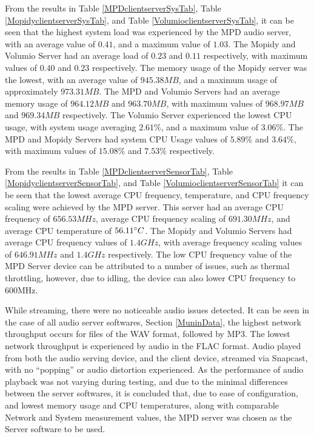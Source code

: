 \documentclass[11pt,a4paper,headinclude=false,footinclude=false]{scrreprt}
\begin{document}
From the results in Table \ref{MPDclientserverSysTab}, Table
\ref{MopidyclientserverSysTab}, and Table
\ref{VolumioclientserverSysTab}, it can be seen that the highest system
load was experienced by the MPD audio server, with an average value of
\(0.41\), and a maximum value of \(1.03\). The Mopidy and Volumio Server
had an average load of \(0.23\) and \(0.11\) respectively, with maximum
values of \(0.40\) and \(0.23\) respectively. The memory usage of the
Mopidy server was the lowest, with an average value of \(945.38MB\), and
a maximum usage of approximately \(973.31MB\). The MPD and Volumio
Servers had an average memory usage of \(964.12MB\) and \(963.70MB\),
with maximum values of \(968.97MB\) and \(969.34MB\) respectively. The
Volumio Server experienced the lowest CPU usage, with system usage
averaging \(2.61\%\), and a maximum value of \(3.06\%\). The MPD and
Mopidy Servers had system CPU Usage values of \(5.89\%\) and \(3.64\%\),
with maximum values of \(15.08\%\) and \(7.53\%\) respectively.

From the results in Table \ref{MPDclientserverSensorTab}, Table
\ref{MopidyclientserverSensorTab}, and Table
\ref{VolumioclientserverSensorTab} it can be seen that the lowest
average CPU frequency, temperature, and CPU frequency scaling were
achieved by the MPD server. This server had an average CPU frequency of
\(656.53MHz\), average CPU frequency scaling of \(691.30MHz\), and
average CPU temperature of \(56.11 \degree C\). The Mopidy and Volumio
Servers had average CPU frequency values of \(1.4GHz\), with average
frequency scaling values of \(646.91MHz\) and \(1.4GHz\) respectively.
The low CPU frequency value of the MPD Server device can be attributed
to a number of issues, such as thermal throttling, however, due to
idling, the device can also lower CPU frequency to 600MHz\cite{RPiFreq}.

While streaming, there were no noticeable audio issues detected. It can
be seen in the case of all audio server softwares, Section
\ref{MuninData}, the highest network throughput occurs for files of the
WAV format, followed by MP3. The lowest network throughput is
experienced by audio in the FLAC format. Audio played from both the
audio serving device, and the client device, streamed via Snapcast, with
no ``popping'' or audio distortion experienced. As the performance of
audio playback was not varying during testing, and due to the minimal
differences between the server softwares, it is concluded that, due to
ease of configuration, and lowest memory usage and CPU temperatures,
along with comparable Network and System measurement values, the MPD
server was chosen as the Server software to be used.
\end{document}
